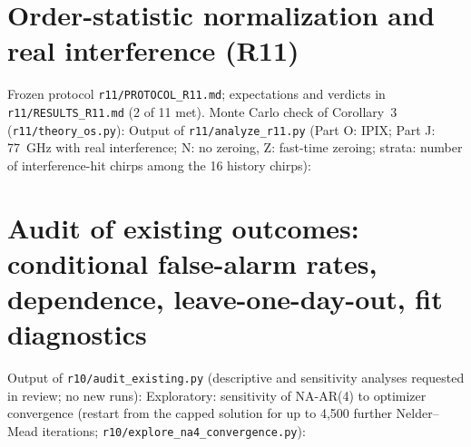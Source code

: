 \documentclass[10pt]{article}
\begin{document}
\section{Order-statistic normalization and real interference (R11)}
Frozen protocol \texttt{r11/PROTOCOL\_R11.md}; expectations and verdicts in \texttt{r11/RESULTS\_R11.md} (2 of 11 met). Monte Carlo check of Corollary~3 (\texttt{r11/theory\_os.py}):
\noindent Output of \texttt{r11/analyze\_r11.py} (Part O: IPIX; Part J: 77~GHz with real interference; N: no zeroing, Z: fast-time zeroing; strata: number of interference-hit chirps among the 16 history chirps):

\section{Audit of existing outcomes: conditional false-alarm rates, dependence, leave-one-day-out, fit diagnostics}
Output of \texttt{r10/audit\_existing.py} (descriptive and sensitivity analyses requested in review; no new runs):
\noindent Exploratory: sensitivity of NA-AR(4) to optimizer convergence (restart from the capped solution for up to 4,500 further Nelder--Mead iterations; \texttt{r10/explore\_na4\_convergence.py}):


\end{document}
